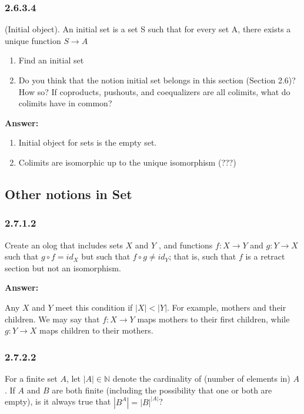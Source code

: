 \documentclass{article}
\newcommand{\N}{\mathbb{N}}
\newcommand{\vsp}[0]{\vspace*{10pt}\par}
\newcommand{\exercise}[1]{\subsubsection*{#1}}
\newcommand{\ans}[0]{\vsp\textbf{Answer: }\vsp}
\newcommand{\ei}{\item}
\newcommand{\eb}{\begin{enumerate}[label=(\alph*)]\ei}
\newcommand{\ee}{\end{enumerate}}
\begin{document}
\begin{center}
\end{center}


\exercise{2.6.3.4}

(Initial object). An initial set is a set S such that for every set A, there
exists a unique function $S \to A$

\eb Find an initial set
\ei Do you think that the notion initial set belongs in this section (Section
    2.6)? How so? If coproducts, pushouts, and coequalizers are all colimits,
    what do colimits have in common?
\ee

\ans

\eb Initial object for sets is the empty set.
\ei Colimits are isomorphic up to the unique isomorphism (???)
\ee

\subsection{Other notions in Set}

\exercise{2.7.1.2}

Create an olog that includes sets $X$ and $Y$ , and functions $f : X \to Y$ and
$g: Y \to X$ such that $g \circ f = id_X$ but such that $f \circ g \ne id_Y$;
that is, such that $f$ is a retract section but not an isomorphism.

\ans

Any $X$ and $Y$ meet this condition if $|X| < |Y|$. For example, mothers and
their children. We may say that $f:X \to Y$ maps mothers to their first
children, while $g:Y \to X$ maps children to their mothers.

\exercise{2.7.2.2}

For a finite set $A$, let $|A| \in \N$ denote the cardinality of (number of
elements in) $A$. If $A$ and $B$ are both finite (including the possibility that
one or both are empty), is it always true that $|B^A| = |B|^{|A|}$?
\end{document}

